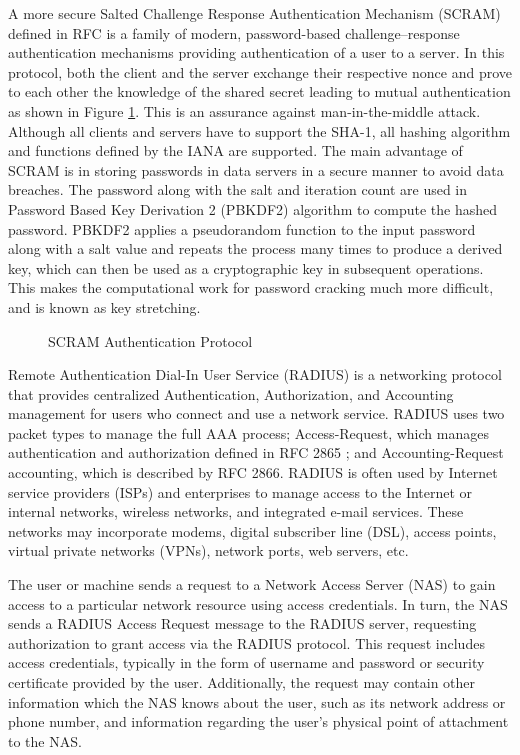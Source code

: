 \begin{multicols}{2}
A more secure Salted Challenge Response Authentication Mechanism (SCRAM) defined in RFC \cite{key7} is a family of modern, password-based challenge--response authentication mechanisms providing authentication of a user to a server. In this protocol, both the client and the server exchange their respective nonce and prove to each other the knowledge of the shared secret leading to mutual authentication as shown in Figure \ref{chap2-fig2}. This is an assurance against man-in-the-middle attack. Although all clients and servers have to support the SHA-1, all hashing algorithm and functions defined by the IANA are supported. The main advantage of SCRAM is in storing passwords in data servers in a secure manner to avoid data breaches. The password along with the salt and iteration count are used in Password Based Key Derivation 2 (PBKDF2) algorithm to compute the hashed password. PBKDF2 applies a pseudorandom function to the input password along with a salt value and repeats the process many times to produce a derived key, which can then be used as a cryptographic key in subsequent operations. This makes the computational work for password cracking much more difficult, and is known as key stretching.
\begin{figure}[!ht]
\centering
\caption{SCRAM Authentication Protocol}\label{chap2-fig2}
\end{figure}

Remote Authentication Dial-In User Service (RADIUS) is a networking protocol that provides centralized Authentication, Authorization, and Accounting management for users who connect and use a network service. RADIUS uses two packet types to manage the full AAA process; Access-Request, which manages authentication and authorization defined in RFC 2865 \cite{key8}; and Accounting-Request accounting, which is described by RFC 2866. RADIUS is often used by Internet service providers (ISPs) and enterprises to manage access to the Internet or internal networks, wireless networks, and integrated e-mail services. These networks may incorporate modems, digital subscriber line (DSL), access points, virtual private networks (VPNs), network ports, web servers, etc.

The user or machine sends a request to a Network Access Server (NAS) to gain access to a particular network resource using access credentials. In turn, the NAS sends a RADIUS Access Request message to the RADIUS server, requesting authorization to grant access via the RADIUS protocol. This request includes access credentials, typically in the form of username and password or security certificate provided by the user. Additionally, the request may contain other information which the NAS knows about the user, such as its network address or phone number, and information regarding the user's physical point of attachment to the NAS. 


\end{multicols}
